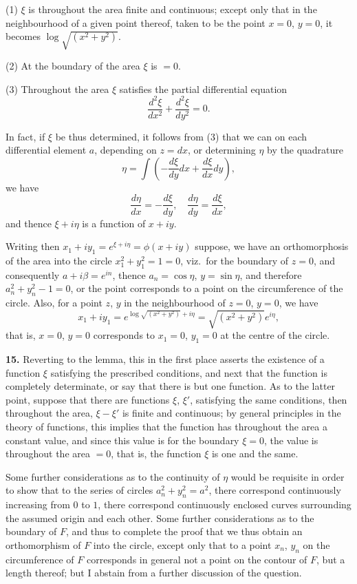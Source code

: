 \documentclass[11pt,a4paper]{article}
\begin{document}
(1) $\xi$ is throughout the area finite and continuous; except only that in the neighbourhood of a given point thereof, taken to be the point $x = 0$, $y = 0$, it becomes $\log \sqrt{(x^2 + y^2)}$.

(2) At the boundary of the area $\xi$ is $= 0$.

(3) Throughout the area $\xi$ satisfies the partial differential equation
\[
\frac{d^2 \xi}{d x^2} + \frac{d^2 \xi}{d y^2} = 0.
\]

In fact, if $\xi$ be thus determined, it follows from (3) that we can on each differential element $a$, depending on $z = dx$, or determining $\eta$ by the quadrature
\[
\eta = \int \left(-\frac{d \xi}{dy} dx + \frac{d \xi}{dx} dy\right),
\]
we have
\[
\frac{d\eta}{d x} = -\frac{d \xi}{d y}, \quad \frac{d \eta}{d y} = \frac{d \xi}{d x},
\]
and thence $\xi + i\eta$ is a function of $x + iy$.

Writing then $x_1 + i y_1 = e^{\xi + i \eta} = \phi(x + iy)$ suppose, we have an orthomorphosis of the area into the circle $x_1^2 + y_1^2 = 1 = 0$, viz.\ for the boundary of $z = 0$, and consequently $a + i\beta = e^{i n}$, thence $a_n = \cos \eta$, $y = \sin \eta$, and therefore $a_n^2 + y_n^2 - 1 = 0$, or the point corresponds to a point on the circumference of the circle. Also, for a point $z$, $y$ in the neighbourhood of $z = 0$, $y = 0$, we have
\[
x_1 + i y_1 = e^{\log \sqrt{(x^2 + y^2)} + i \eta} = \sqrt{(x^2 + y^2)} e^{i\eta},
\]
that is, $x = 0$, $y = 0$ corresponds to $x_1 = 0$, $y_1 = 0$ at the centre of the circle.

\textbf{15.} Reverting to the lemma, this in the first place asserts the existence of a function $\xi$ satisfying the prescribed conditions, and next that the function is completely determinate, or say that there is but one function. As to the latter point, suppose that there are functions $\xi$, $\xi'$, satisfying the same conditions, then throughout the area, $\xi - \xi'$ is finite and continuous; by general principles in the theory of functions, this implies that the function has throughout the area a constant value, and since this value is for the boundary $\xi = 0$, the value is throughout the area $= 0$, that is, the function $\xi$ is one and the same.

Some further considerations as to the continuity of $\eta$ would be requisite in order to show that to the series of circles $a_n^2 + y_n^2 = a^2$, there correspond continuously increasing from $0$ to $1$, there correspond continuously enclosed curves surrounding the assumed origin and each other. Some further considerations as to the boundary of $F$, and thus to complete the proof that we thus obtain an orthomorphism of $F$ into the circle, except only that to a point $x_n$, $y_n$ on the circumference of $F$ corresponds in general not a point on the contour of $F$, but a length thereof; but I abstain from a further discussion of the question.
\end{document}
